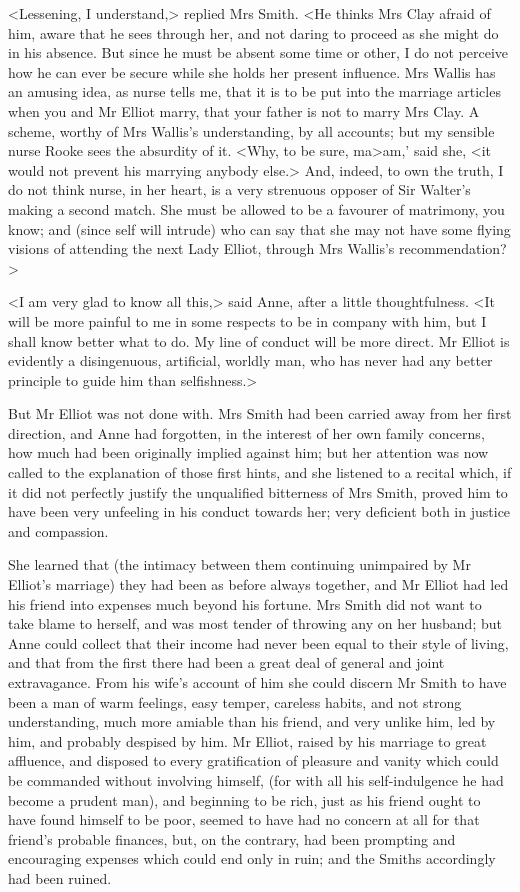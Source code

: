<Lessening, I understand,> replied Mrs Smith. <He thinks Mrs Clay afraid of him, aware that he sees through her, and not daring to proceed as she might do in his absence. But since he must be absent some time or other, I do not perceive how he can ever be secure while she holds her present influence. Mrs Wallis has an amusing idea, as nurse tells me, that it is to be put into the marriage articles when you and Mr Elliot marry, that your father is not to marry Mrs Clay. A scheme, worthy of Mrs Wallis's understanding, by all accounts; but my sensible nurse Rooke sees the absurdity of it. <Why, to be sure, ma>am,' said she, <it would not prevent his marrying anybody else.> And, indeed, to own the truth, I do not think nurse, in her heart, is a very strenuous opposer of Sir Walter's making a second match. She must be allowed to be a favourer of matrimony, you know; and (since self will intrude) who can say that she may not have some flying visions of attending the next Lady Elliot, through Mrs Wallis's recommendation?>

<I am very glad to know all this,> said Anne, after a little thoughtfulness. <It will be more painful to me in some respects to be in company with him, but I shall know better what to do. My line of conduct will be more direct. Mr Elliot is evidently a disingenuous, artificial, worldly man, who has never had any better principle to guide him than selfishness.>

But Mr Elliot was not done with. Mrs Smith had been carried away from her first direction, and Anne had forgotten, in the interest of her own family concerns, how much had been originally implied against him; but her attention was now called to the explanation of those first hints, and she listened to a recital which, if it did not perfectly justify the unqualified bitterness of Mrs Smith, proved him to have been very unfeeling in his conduct towards her; very deficient both in justice and compassion.

She learned that (the intimacy between them continuing unimpaired by Mr Elliot's marriage) they had been as before always together, and Mr Elliot had led his friend into expenses much beyond his fortune. Mrs Smith did not want to take blame to herself, and was most tender of throwing any on her husband; but Anne could collect that their income had never been equal to their style of living, and that from the first there had been a great deal of general and joint extravagance. From his wife's account of him she could discern Mr Smith to have been a man of warm feelings, easy temper, careless habits, and not strong understanding, much more amiable than his friend, and very unlike him, led by him, and probably despised by him. Mr Elliot, raised by his marriage to great affluence, and disposed to every gratification of pleasure and vanity which could be commanded without involving himself, (for with all his self-indulgence he had become a prudent man), and beginning to be rich, just as his friend ought to have found himself to be poor, seemed to have had no concern at all for that friend's probable finances, but, on the contrary, had been prompting and encouraging expenses which could end only in ruin; and the Smiths accordingly had been ruined.

